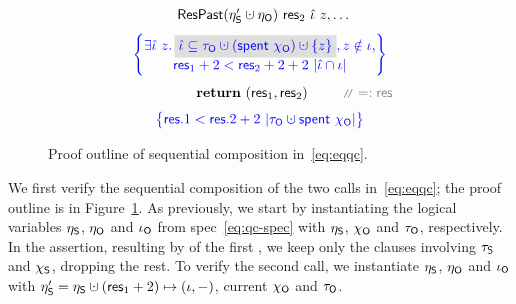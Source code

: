 \begin{figure}
\[{{\begin{array}{c}
{\begin{array}{c}
  \happrox (\gists' \hunion \gisto)~\res_2~\iknh~z, \ldots
\end{array}
\!\!\!}
\\\\[-5pt]
\spec{\!\!\!
\begin{array}{c}
  \exists \iknh~z \ldot     
  \gbm{\iknh \subseteq \tkno \hunion (\Tomb~\histo) \hunion \set{z}},
  z \notin \ikn,\\[2pt] 
  \res_1 + 2 < \res_2 + 2 + 2~|\iknh \cap \ikn|
\end{array}
\!\!\!}
\\\\[-5pt]  
~~~~~~~~~~~~~~~
\kw{return}~(\res_1, \res_2) ~\comm{=: \res}
\\\\[-5pt]
\spec{\!\!\!
\begin{array}{c}
  \res.1 < \res.2 + 2 \ |\tkno \hunion \Tomb~\histo| 
  \end{array}
  \!\!\!} %
\end{array}
}} 
\]
%
%
\caption{Proof outline of sequential composition in~\eqref{eq:eqqc}.}
\label{fig:proof2}
\end{figure}

We first verify the sequential composition of the two calls
in~\eqref{eq:eqqc}; the proof outline is in
Figure~\ref{fig:proof2}. 
%
%
As previously, we start by instantiating the logical variables
$\eta_{\mathsf{S}}$, $\eta_{\mathsf{O}}$ and $\iota_{\mathsf{O}}$ from spec~\eqref{eq:qc-spec} with
$\eta_{\mathsf{S}}$, $\chi_{\mathsf{O}}$ and $\tau_{\mathsf{O}}$, respectively. In the assertion,
resulting by of the first , we keep only the clauses
involving $\tau_{\mathsf{S}}$ and $\chi_{\mathsf{S}}$, dropping the rest.
%
To verify the second  call, we instantiate $\eta_{\mathsf{S}}$,
$\eta_{\mathsf{O}}$ and $\iota_{\mathsf{O}}$ with $\gists' = \gists \hunion (\res_1+2) \mapsto
(\ikn, -)$, current $\chi_{\mathsf{O}}$ and $\tau_{\mathsf{O}}$.

